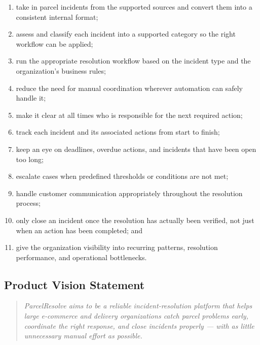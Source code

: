 \documentclass[11pt,a4paper]{article}
\begin{document}
\begin{enumerate}
    \item take in parcel incidents from the supported sources and
    convert them into a consistent internal format;

    \item assess and classify each incident into a supported category
    so the right workflow can be applied;

    \item run the appropriate resolution workflow based on the incident
    type and the organization's business rules;

    \item reduce the need for manual coordination wherever automation
    can safely handle it;

    \item make it clear at all times who is responsible for the next
    required action;

    \item track each incident and its associated actions from start
    to finish;

    \item keep an eye on deadlines, overdue actions, and incidents
    that have been open too long;

    \item escalate cases when predefined thresholds or conditions are
    not met;

    \item handle customer communication appropriately throughout the
    resolution process;

    \item only close an incident once the resolution has actually been
    verified, not just when an action has been completed; and

    \item give the organization visibility into recurring patterns,
    resolution performance, and operational bottlenecks.
\end{enumerate}


\subsection{Product Vision Statement}

\begin{quote}
\textit{ParcelResolve aims to be a reliable incident-resolution
platform that helps large e-commerce and delivery organizations catch
parcel problems early, coordinate the right response, and close
incidents properly --- with as little unnecessary manual effort as
possible.}
\end{quote}
\end{document}
